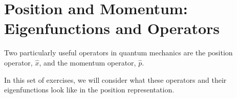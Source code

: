 %
%
%
%

\section*{Position and Momentum: Eigenfunctions and Operators}

	Two particularly useful operators in quantum mechanics are the position operator, $\hat x$, and the momentum operator, $\hat p$.
	
	In this set of exercises, we will consider what these operators and their eigenfunctions look like in the position representation.
	
	\vspace{0.25in}
	
